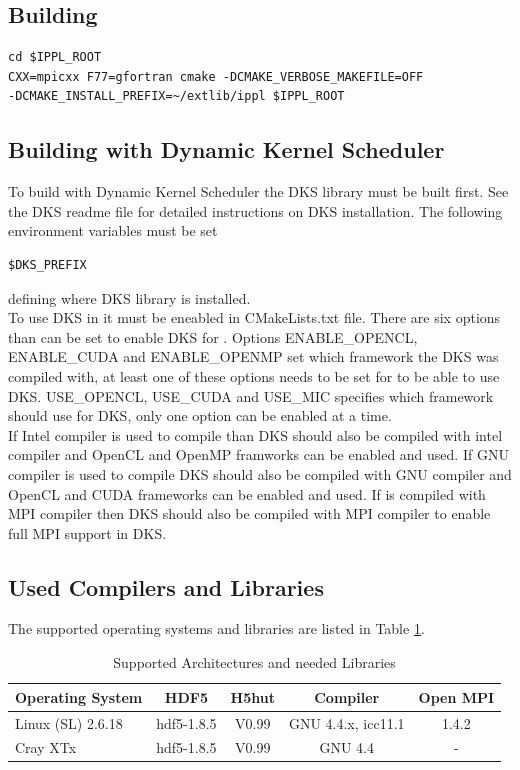 \subsection{Building \ippl}
\begin{verbatim}
cd $IPPL_ROOT
CXX=mpicxx F77=gfortran cmake -DCMAKE_VERBOSE_MAKEFILE=OFF
-DCMAKE_INSTALL_PREFIX=~/extlib/ippl $IPPL_ROOT
\end{verbatim}


\subsection{Building \ippl with Dynamic Kernel Scheduler}
To build \ippl with Dynamic Kernel Scheduler the DKS library must be built first. See the DKS readme file
for detailed instructions on DKS installation. The following environment variables must be set
\begin{verbatim}
$DKS_PREFIX
\end{verbatim}
defining where DKS library is installed.\\
To use DKS in \ippl it must be eneabled in CMakeLists.txt file. There are six options than can be set to
enable DKS for \ippl. Options ENABLE\_OPENCL, ENABLE\_CUDA and ENABLE\_OPENMP set which framework the 
DKS  was compiled with, at least one of these options needs to be set for \ippl to be able 
to use DKS. USE\_OPENCL, USE\_CUDA and USE\_MIC specifies which framework \ippl should use for DKS, only one 
option can be enabled at a time.\\ 
If Intel compiler is used to compile \ippl than DKS should also be compiled 
with intel compiler and OpenCL and OpenMP framworks can be enabled and used. If GNU compiler is used to compile 
\ippl DKS should also be compiled with GNU compiler and OpenCL and CUDA frameworks can be enabled and used. 
If \ippl is compiled with MPI compiler then DKS should also be compiled with MPI compiler to enable full MPI 
support in DKS.


\subsection{Used Compilers and Libraries}
The supported operating systems and libraries are listed in Table \ref{tab:archlib}.
\begin{table}[h]
  \caption{Supported Architectures and needed Libraries}
  \label{tab:archlib}
  \begin{center}
    \begin{tabular}{|lcccc|}
      \hline
      Operating System & HDF5  & H5hut & Compiler & Open MPI\\
      \hline
      Linux (SL) 2.6.18 & hdf5-1.8.5 & V0.99 & GNU 4.4.x, icc11.1 & 1.4.2 \\
      Cray XTx  & hdf5-1.8.5 & V0.99 & GNU 4.4 & - \\
      \hline
    \end{tabular}
  \end{center}
\end{table}





